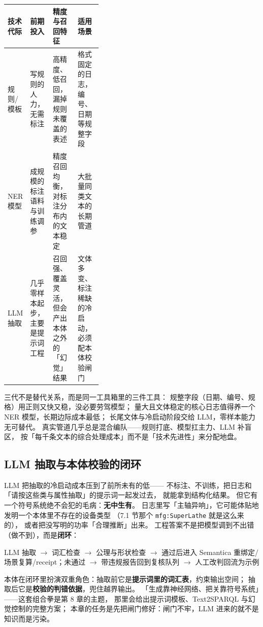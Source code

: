 \begin{center}
\begin{tabularx}{\linewidth}{@{}p{0.13\linewidth}p{0.24\linewidth}XX@{}}
\toprule
\textbf{技术代际} & \textbf{前期投入} & \textbf{精度与召回特征} & \textbf{适用场景} \\
\midrule
规则/模板 & 写规则的人力，无需标注 & 高精度、低召回，漏掉规则未覆盖的表述 & 格式固定的日志，编号、日期等规整字段 \\
NER 模型 & 成规模的标注语料与训练调参 & 精度召回均衡，对标注分布内的文本稳定 & 大批量同类文本的长期管道 \\
LLM 抽取 & 几乎零样本起步，主要是提示词工程 & 召回强、覆盖灵活，但会产出本体之外的「幻觉」结果 & 文体多变、标注稀缺的冷启动，必须配本体校验闸门 \\
\bottomrule
\end{tabularx}
\end{center}

三代不是替代关系，而是同一工具箱里的三件工具：
规整字段（日期、编号、规格）用正则又快又稳，没必要劳驾模型；
量大且文体稳定的核心日志值得养一个 NER 模型，长期边际成本最低；
长尾文体与冷启动阶段交给 LLM，零样本能力无可替代。
真实管道几乎总是混合编队——规则打底、模型扛主力、LLM 补盲区，
按「每千条文本的综合处理成本」而不是「技术先进性」来分配地盘。

\subsection{LLM 抽取与本体校验的闭环}

LLM 把抽取的冷启动成本压到了前所未有的低——
不标注、不训练，把日志和「请按这些类与属性抽取」的提示词一起发过去，
就能拿到结构化结果。
但它有一个符号系统绝不会犯的毛病：\textbf{无中生有}。
日志里写「主轴异响」，它可能体贴地发明一个本体里不存在的设备类型
（7.1 节那个 \texttt{mfg:SuperLathe} 就是这么来的），
或者把没写明的功率「合理推断」出来。
工程答案不是把模型调到不出错（做不到），而是\textbf{闭环}：

\begin{center}
LLM 抽取 \(\rightarrow\) 词汇检查 \(\rightarrow\) 公理与形状检查 \(\rightarrow\)
通过后进入 Semantica 重绑定/场景复算/receipt；未通过 \(\rightarrow\)
带违规报告回到复核队列 \(\rightarrow\) 人工改判回流为示例
\end{center}

本体在闭环里扮演双重角色：抽取前它是\textbf{提示词里的词汇表}，约束输出空间；
抽取后它是\textbf{校验的判错依据}，兜住越界输出。
「生成靠神经网络、把关靠符号系统」——这套组合拳是第 8 章的主题，
那里会给出提示词模板、Text2SPARQL 与幻觉控制的完整方案；
本章的任务是先把闸门修好：闸门不牢，LLM 进来的就不是知识而是污染。

